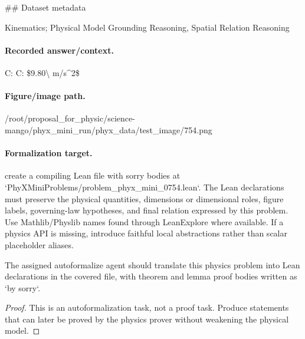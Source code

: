 \#\# Dataset metadata

Kinematics; Physical Model Grounding Reasoning, Spatial Relation Reasoning

\paragraph{Recorded answer/context.}
C: C: \$9.80\textbackslash{} m/s\textasciicircum{}2\$

\paragraph{Figure/image path.}
/root/proposal\_for\_physic/science-mango/phyx\_mini\_run/phyx\_data/test\_image/754.png

\paragraph{Formalization target.}
create a compiling Lean file with sorry bodies at `PhyXMiniProblems/problem\_phyx\_mini\_0754.lean`. The Lean declarations must preserve the physical quantities, dimensions or dimensional roles, figure labels, governing-law hypotheses, and final relation expressed by this problem.
Use Mathlib/Physlib names found through LeanExplore where available. If a physics API is missing, introduce faithful local abstractions rather than scalar placeholder aliases.

\begin{theorem}
\label{thm:physics:phyx_mini_0754:target}
The assigned autoformalize agent should translate this physics problem into Lean declarations in the covered file, with theorem and lemma proof bodies written as `by sorry`.
\end{theorem}
\begin{proof}
This is an autoformalization task, not a proof task. Produce statements that can later be proved by the physics prover without weakening the physical model.
\end{proof}

